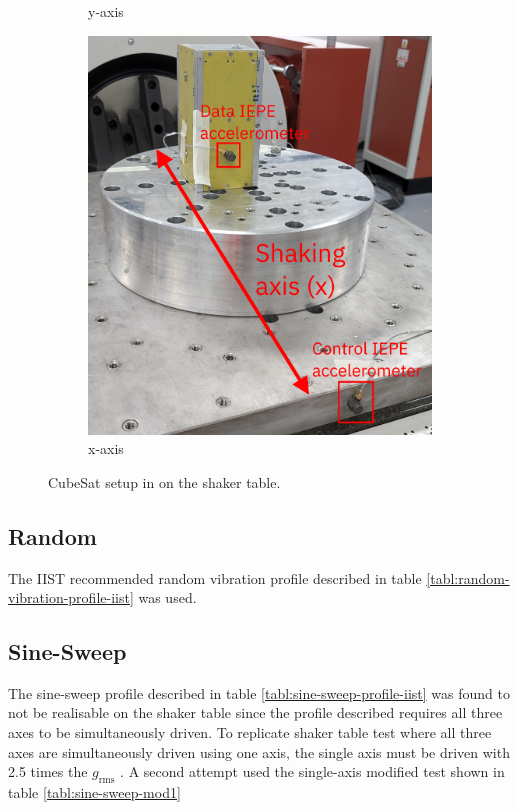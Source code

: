 \documentclass{report}
\begin{document}
\begin{figure}[H]
\begin{subfigure}{0.32\textwidth}
    \caption{y-axis}
  \end{subfigure}
  \begin{subfigure}{0.32\textwidth}
    \includegraphics[width=\linewidth]{images/x-axis-setup.jpg}
    \caption{x-axis}
  \end{subfigure}
  \caption{CubeSat setup in on the shaker table.}
  \label{fig:shaker-axis-setup}
\end{figure}

\subsection{Random}

The IIST recommended random vibration profile described in table \ref{tabl:random-vibration-profile-iist} was used.

\subsection{Sine-Sweep}

The sine-sweep profile described in table \ref{tabl:sine-sweep-profile-iist} was found to not be realisable on the shaker table since the profile described requires all three axes to be simultaneously driven. To replicate shaker table test where all three axes are simultaneously driven using one axis, the single axis must be driven with 2.5 times the $g_\text{rms}$ \cite{nath2022study}. A second attempt used the single-axis modified test shown in table \ref{tabl:sine-sweep-mod1}
\end{document}
